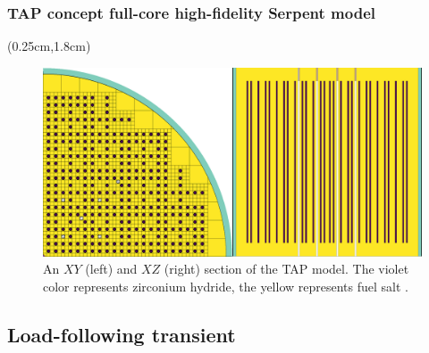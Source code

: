 \begin{frame}
\frametitle{\gls{TAP} concept full-core high-fidelity Serpent model}
\begin{textblock*}{12.25cm}(0.25cm,1.8cm) %
	\begin{figure}[htp!] %
		\includegraphics[width=\textwidth]{./images/tap_model.png}
		\caption{An $XY$ (left) and $XZ$ (right) section of the \gls{TAP} 
		model. The violet color represents zirconium hydride, the yellow 
		represents fuel salt \cite{rykhlevskii_milestone_2019}.}
	\end{figure}
\end{textblock*}
\end{frame}


\subsection{Load-following transient}

